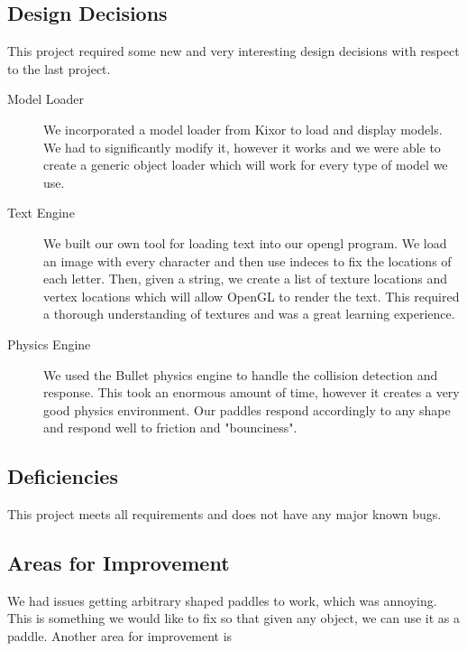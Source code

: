 \documentclass[10pt]{report}
\begin{document}
\subsection*{Design Decisions}
This project required some new and very interesting design decisions with respect to the last project.
\begin{description}
\item[Model Loader] We incorporated a model loader from Kixor to load and display models. We had to significantly
                   modify it, however it works and we were able to create a generic object loader which will
                   work for every type of model we use. 
\item[Text Engine] We built our own tool for loading text into our opengl program. We load an image with every
character and then use indeces to fix the locations of each letter. Then, given a string, we create a list of
texture locations and vertex locations which will allow OpenGL to render the text. This required a thorough 
understanding of textures and was a great learning experience. 

\item[Physics Engine] We used the Bullet physics engine to handle the collision detection and response. This
took an enormous amount of time, however it creates a very good physics environment. Our paddles respond 
accordingly to any shape and respond well to friction and "bounciness".
\end{description}

\subsection*{Deficiencies}
This project meets all requirements and does not have any major known bugs.

\subsection*{Areas for Improvement}
We had issues getting arbitrary shaped paddles to work, which was annoying. This is something we would like to
fix so that given any object, we can use it as a paddle.  Another area for improvement is 
\end{document}
